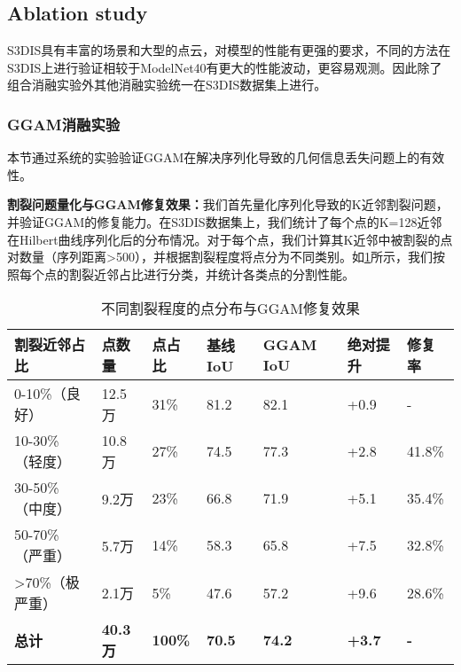 \documentclass[preprint,12pt]{elsarticle}
\begin{document}
\subsection{Ablation study}
S3DIS具有丰富的场景和大型的点云，对模型的性能有更强的要求，不同的方法在S3DIS上进行验证相较于ModelNet40有更大的性能波动，更容易观测。因此除了组合消融实验外其他消融实验统一在S3DIS数据集上进行。




\subsubsection{GGAM消融实验}

本节通过系统的实验验证GGAM在解决序列化导致的几何信息丢失问题上的有效性。


\textbf{割裂问题量化与GGAM修复效果：}我们首先量化序列化导致的K近邻割裂问题，并验证GGAM的修复能力。在S3DIS数据集上，我们统计了每个点的K=128近邻在Hilbert曲线序列化后的分布情况。对于每个点，我们计算其K近邻中被割裂的点对数量（序列距离>500），并根据割裂程度将点分为不同类别。如\cref{tab:split_and_repair}所示，我们按照每个点的割裂近邻占比进行分类，并统计各类点的分割性能。

\begin{table}[htbp!]
	\centering
	\caption{不同割裂程度的点分布与GGAM修复效果}
	\label{tab:split_and_repair}
	\begin{tabular}{@{}lllllll@{}}
		\toprule
		割裂近邻占比 & 点数量 & 点占比 & 基线IoU & GGAM IoU & 绝对提升 & 修复率 \\ 
		\midrule
		0-10\%（良好） & 12.5万 & 31\% & 81.2 & 82.1 & +0.9 & - \\
		\midrule
		10-30\%（轻度） & 10.8万 & 27\% & 74.5 & 77.3 & +2.8 & 41.8\% \\
		30-50\%（中度） & 9.2万 & 23\% & 66.8 & 71.9 & +5.1 & 35.4\% \\
		50-70\%（严重） & 5.7万 & 14\% & 58.3 & 65.8 & +7.5 & 32.8\% \\
		>70\%（极严重） & 2.1万 & 5\% & 47.6 & 57.2 & +9.6 & 28.6\% \\
		\midrule
		\textbf{总计} & \textbf{40.3万} & \textbf{100\%} & \textbf{70.5} & \textbf{74.2} & \textbf{+3.7} & \textbf{-} \\
		\bottomrule
	\end{tabular}
\end{table}
\end{document}
